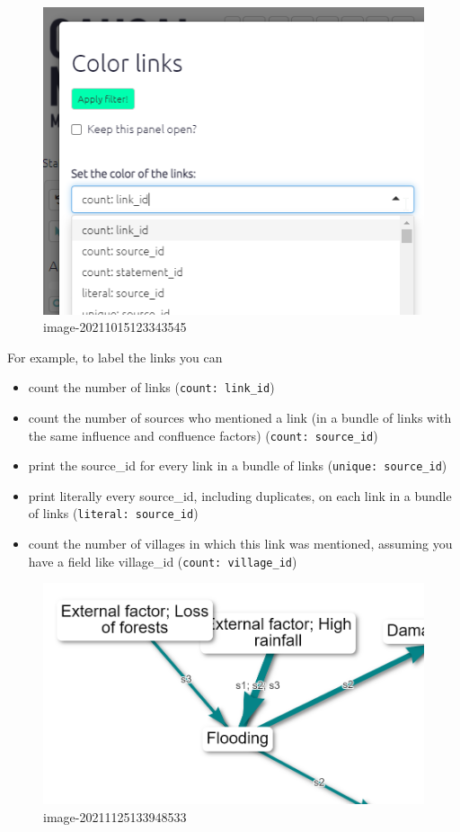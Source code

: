 \documentclass[
]{book}
\providecommand{\tightlist}{%
  \setlength{\itemsep}{0pt}\setlength{\parskip}{0pt}}
\begin{document}
\begin{figure}
\centering
\includegraphics[width=6.77083in,height=\textheight]{_assets/image-20211015123343545.png}
\caption{image-20211015123343545}
\end{figure}

For example, to label the links you can

\begin{itemize}
\tightlist
\item
  count the number of links (\texttt{count:\ link\_id})
\item
  count the number of sources who mentioned a link (in a bundle of links with the same influence and confluence factors) (\texttt{count:\ source\_id})
\item
  print the source\_id for every link in a bundle of links (\texttt{unique:\ source\_id})
\item
  print literally every source\_id, including duplicates, on each link in a bundle of links (\texttt{literal:\ source\_id})
\item
  count the number of villages in which this link was mentioned, assuming you have a field like village\_id (\texttt{count:\ village\_id})
\end{itemize}

\begin{figure}
\centering
\includegraphics[width=6.77083in,height=\textheight]{_assets/image-20211125133948533.png}
\caption{image-20211125133948533}
\end{figure}
\end{document}
